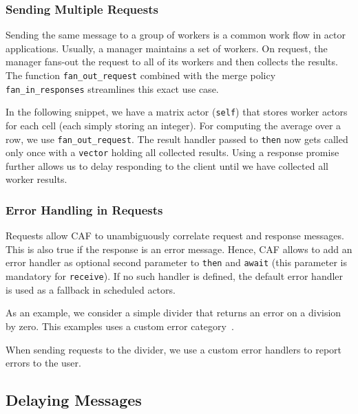\subsubsection{Sending Multiple Requests}

Sending the same message to a group of workers is a common work flow in actor
applications. Usually, a manager maintains a set of workers. On request, the
manager fans-out the request to all of its workers and then collects the
results. The function \lstinline`fan_out_request` combined with the merge policy
\lstinline`fan_in_responses` streamlines this exact use case.

In the following snippet, we have a matrix actor (\lstinline`self`) that stores
worker actors for each cell (each simply storing an integer). For computing the
average over a row, we use \lstinline`fan_out_request`. The result handler
passed to \lstinline`then` now gets called only once with a \lstinline`vector`
holding all collected results. Using a response promise  further
allows us to delay responding to the client until we have collected all worker
results.


\clearpage
\subsubsection{Error Handling in Requests}
\label{error-response}

Requests allow CAF to unambiguously correlate request and response messages.
This is also true if the response is an error message. Hence, CAF allows to
add an error handler as optional second parameter to \lstinline^then^ and
\lstinline^await^ (this parameter is mandatory for \lstinline^receive^). If no
such handler is defined, the default error handler  is used
as a fallback in scheduled actors.

As an example, we consider a simple divider that returns an error on a division
by zero. This examples uses a custom error category~.


When sending requests to the divider, we use a custom error handlers to report
errors to the user.


\clearpage
\subsection{Delaying Messages}
\label{delay-message}

